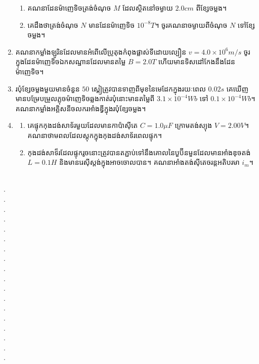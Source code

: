 \documentclass{officialexam}
\begin{document}
\begin{enumerate}[I]
\begin{enumerate}[k]
		\item គណនាដែនម៉ាញេទិចត្រង់ចំណុច $M$ ដែលស្ថិតនៅចម្ងាយ $2.0cm$ ពីខ្សែចម្លង។
		\item គេដឹងថាត្រង់ចំណុច $N$ មានដែនម៉ាញេទិច $10^{-8}T$។ ចូរគណនាចម្ងាយពីចំណុច $N$ ទៅខ្សែចម្លង។
	\end{enumerate}
	\item គណនាកម្លាំងឡូរិនដែលមានអំពើលើប្រូតុងកំពុងផ្លាស់ទីដោយល្បឿន $v=4.0\times10^{6}m/s$ ចូរក្នុងដែនម៉ាញេទិចឯកសណ្ឋានដែលមានតម្លៃ $B=2.0T$ ហើយមានទិសដៅកែងនឹងដែនម៉ាញេទិច។
	\item របុំខ្សែចម្លងមួយមានចំនួន $50$ ស្ពៀត្រូវបានទាញពីមុខនៃមេដែកក្នុងរយៈពេល $0.02s$ គេឃើញមានបម្រែបម្រួលភ្លុចម៉ាញេទិចឆ្លងកាត់របុំនោះមានតម្លៃពី $3.1\times10^{-4}Wb$ ទៅ $0.1\times10^{-4}Wb$។ គណនាកម្លាំងអគ្គិសនីចលករអាំងឌ្វីក្នុងរបុំខ្សែចម្លង។
	\item \begin{enumerate}[k]
		\item គេផ្ទុកកុងដង់សាទ័រមួយដែលមានកាប៉ាសុីតេ $C=1.0\mu F$ ក្រោមតង់ស្យុង $V=2.00V$។ គណនាថាមពលដែលស្តុកក្នុងកុងដង់សាទ័រពេលផ្ទុក។
		\item កុងដង់សាទ៏រដែលផ្ទុករូចនោះត្រូវបានតភ្ជាប់ទៅនឹងគោលនៃបួប៊ីនមួនដែលមានអាំងឌុចតង់ $L=0.1H$ និងមានរេសុីស្តង់ក្នុងអាចចោលបាន។ គណនាអាំងតង់សុីតេចរន្តអតិបរមា $i_m$។
	\end{enumerate}
\end{enumerate}
\\
{\color{white}.}\dotfill\\
{\color{white}.}\dotfill\\
{\color{white}.}\dotfill
\\
{\color{white}.}\dotfill\\
{\color{white}.}\dotfill\\
{\color{white}.}\dotfill
\\
{\color{white}.}\dotfill\\
{\color{white}.}\dotfill\\
{\color{white}.}\dotfill
\\
{\color{white}.}\dotfill\\
{\color{white}.}\dotfill\\
{\color{white}.}\dotfill
\\
{\color{white}.}\dotfill\\
{\color{white}.}\dotfill\\
{\color{white}.}\dotfill
\\
{\color{white}.}\dotfill\\
{\color{white}.}\dotfill\\
{\color{white}.}\dotfill
\end{document}
